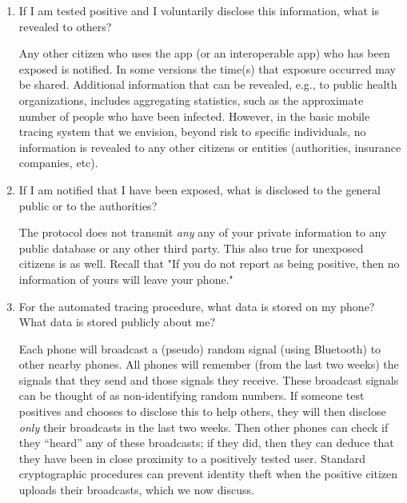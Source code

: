 \documentclass{article}
\newcommand{\TODO}[1]{ {\color{blue} #1 }}
\begin{document}
\begin{enumerate}[leftmargin=*]
\item If I am tested positive and I voluntarily disclose this information, what is revealed to others?

Any other citizen who uses the app (or an interoperable app) who has been exposed is notified. In some versions the time(s) that exposure occurred may be shared. Additional information that can be revealed, e.g., to public health organizations, includes aggregating statistics, such as the approximate number of people who have been infected. However, in the basic mobile tracing system that we envision, beyond risk to specific individuals, no information is revealed to any other citizens or entities (authorities, insurance companies, etc). 

\item If I am notified that I have been exposed, what is disclosed to the general public or to the authorities? 
 
The protocol does not transmit \emph{any} any of your private information to any public database or any other third party. This also true for unexposed citizens is as well. Recall that "If you do not report as being positive, then no information of yours will leave your phone."

\item For the automated tracing procedure, what data is stored on my phone? What data is stored publicly about me?

Each phone will broadcast a (pseudo) random signal (using Bluetooth) to other nearby phones. All phones will remember (from the last two weeks) the signals that they send and those signals they receive. These broadcast signals can be thought of as non-identifying random numbers. 
If someone test positives and chooses to disclose this to help others, they will then disclose \emph{only} their broadcasts in the last two weeks. Then other phones can check if they ``heard'' any of these broadcasts; if they did, then they can deduce that they have been in close proximity to a positively tested user.  Standard cryptographic procedures can prevent identity theft when the positive citizen uploads their broadcasts, which we now discuss.

\iffalse
\item Is any of my location information ever broadcast to the world?

No location information ever leaves your phone in the mobile-tracing protocol.  This one advantage of this particular Bluetooth beaconing based approach.   One could design GPS-centric approaches to mobile-tracing. Here, all individuals geo-location information would have to leave their phones; the approach would have to heavily rely on secure cryptography for privacy.
\fi

\end{enumerate}
\end{document}
